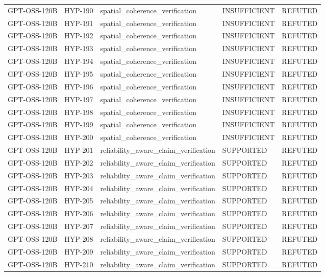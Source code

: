\begin{tabular}{lllll}
GPT-OSS-120B & HYP-190 & spatial_coherence_verification & INSUFFICIENT & REFUTED \\
GPT-OSS-120B & HYP-191 & spatial_coherence_verification & INSUFFICIENT & REFUTED \\
GPT-OSS-120B & HYP-192 & spatial_coherence_verification & INSUFFICIENT & REFUTED \\
GPT-OSS-120B & HYP-193 & spatial_coherence_verification & INSUFFICIENT & REFUTED \\
GPT-OSS-120B & HYP-194 & spatial_coherence_verification & INSUFFICIENT & REFUTED \\
GPT-OSS-120B & HYP-195 & spatial_coherence_verification & INSUFFICIENT & REFUTED \\
GPT-OSS-120B & HYP-196 & spatial_coherence_verification & INSUFFICIENT & REFUTED \\
GPT-OSS-120B & HYP-197 & spatial_coherence_verification & INSUFFICIENT & REFUTED \\
GPT-OSS-120B & HYP-198 & spatial_coherence_verification & INSUFFICIENT & REFUTED \\
GPT-OSS-120B & HYP-199 & spatial_coherence_verification & INSUFFICIENT & REFUTED \\
GPT-OSS-120B & HYP-200 & spatial_coherence_verification & INSUFFICIENT & REFUTED \\
GPT-OSS-120B & HYP-201 & reliability_aware_claim_verification & SUPPORTED & REFUTED \\
GPT-OSS-120B & HYP-202 & reliability_aware_claim_verification & SUPPORTED & REFUTED \\
GPT-OSS-120B & HYP-203 & reliability_aware_claim_verification & SUPPORTED & REFUTED \\
GPT-OSS-120B & HYP-204 & reliability_aware_claim_verification & SUPPORTED & REFUTED \\
GPT-OSS-120B & HYP-205 & reliability_aware_claim_verification & SUPPORTED & REFUTED \\
GPT-OSS-120B & HYP-206 & reliability_aware_claim_verification & SUPPORTED & REFUTED \\
GPT-OSS-120B & HYP-207 & reliability_aware_claim_verification & SUPPORTED & REFUTED \\
GPT-OSS-120B & HYP-208 & reliability_aware_claim_verification & SUPPORTED & REFUTED \\
GPT-OSS-120B & HYP-209 & reliability_aware_claim_verification & SUPPORTED & REFUTED \\
GPT-OSS-120B & HYP-210 & reliability_aware_claim_verification & SUPPORTED & REFUTED \\

\end{tabular}
